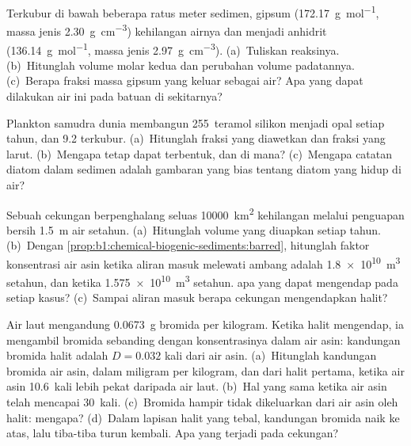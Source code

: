 \begin{exercise}[$\star\star$]\label{exo:b1:chemical-biogenic-sediments:8}
Terkubur di bawah beberapa ratus meter sedimen, gipsum  (\qty{172.17}{g.mol^{-1}}, massa jenis \qty{2.30}{g.cm^{-3}}) kehilangan airnya dan menjadi anhidrit  (\qty{136.14}{g.mol^{-1}}, massa jenis \qty{2.97}{g.cm^{-3}}). (a)~Tuliskan reaksinya. (b)~Hitunglah volume molar kedua  dan perubahan volume padatannya. (c)~Berapa fraksi massa gipsum yang keluar sebagai air? Apa yang dapat dilakukan air ini pada batuan di sekitarnya?
\end{exercise}

\begin{exercise}[$\star\star$]\label{exo:b1:chemical-biogenic-sediments:9}
Plankton samudra dunia membangun 255~teramol silikon menjadi opal setiap tahun, dan 9.2 terkubur. (a)~Hitunglah fraksi yang diawetkan dan fraksi yang larut. (b)~Mengapa  tetap dapat terbentuk, dan di mana? (c)~Mengapa catatan diatom dalam sedimen adalah gambaran yang bias tentang diatom yang hidup di air?
\end{exercise}

\begin{exercise}[$\star\star\star$]\label{exo:b1:chemical-biogenic-sediments:10}
Sebuah cekungan berpenghalang seluas \qty{10000}{km^2} kehilangan melalui penguapan bersih \qty{1.5}{m} air setahun. (a)~Hitunglah volume yang diuapkan setiap tahun. (b)~Dengan \cref{prop:b1:chemical-biogenic-sediments:barred}, hitunglah faktor konsentrasi air asin ketika aliran masuk melewati ambang adalah \qty{1.8e10}{m^3} setahun, dan ketika \qty{1.575e10}{m^3} setahun.  apa yang dapat mengendap pada setiap kasus? (c)~Sampai aliran masuk berapa cekungan mengendapkan halit?
\end{exercise}

\begin{exercise}[$\star\star\star$]\label{exo:b1:chemical-biogenic-sediments:11}
Air laut mengandung \qty{0.0673}{g} bromida per kilogram. Ketika halit mengendap, ia mengambil bromida sebanding dengan konsentrasinya dalam air asin: kandungan bromida halit adalah $D = 0.032$ kali dari air asin. (a)~Hitunglah kandungan bromida air asin, dalam miligram per kilogram, dan dari halit pertama, ketika air asin 10.6~kali lebih pekat daripada air laut. (b)~Hal yang sama ketika air asin telah mencapai 30~kali. (c)~Bromida hampir tidak dikeluarkan dari air asin oleh halit: mengapa? (d)~Dalam lapisan halit yang tebal, kandungan bromida naik ke atas, lalu tiba-tiba turun kembali. Apa yang terjadi pada cekungan?
\end{exercise}

